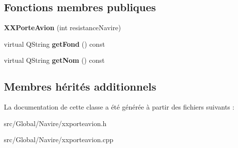 \subsection*{Fonctions membres publiques}
\begin{DoxyCompactItemize}
\item 
{\bfseries X\+X\+Porte\+Avion} (int resistance\+Navire)\hypertarget{class_x_x_porte_avion_ad5c39ed6ecca866af366de3915f0b9eb}{}\label{class_x_x_porte_avion_ad5c39ed6ecca866af366de3915f0b9eb}

\item 
virtual Q\+String {\bfseries get\+Fond} () const \hypertarget{class_x_x_porte_avion_a7a0a8f53ff4a54612eba4f4535a50ecf}{}\label{class_x_x_porte_avion_a7a0a8f53ff4a54612eba4f4535a50ecf}

\item 
virtual Q\+String {\bfseries get\+Nom} () const \hypertarget{class_x_x_porte_avion_a6f2a7358cfd76f2f5afba6dac2ac116b}{}\label{class_x_x_porte_avion_a6f2a7358cfd76f2f5afba6dac2ac116b}

\end{DoxyCompactItemize}
\subsection*{Membres hérités additionnels}


La documentation de cette classe a été générée à partir des fichiers suivants \+:\begin{DoxyCompactItemize}
\item 
src/\+Global/\+Navire/xxporteavion.\+h\item 
src/\+Global/\+Navire/xxporteavion.\+cpp\end{DoxyCompactItemize}
